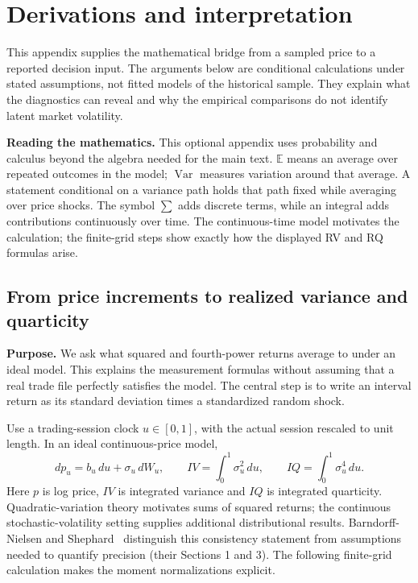 \section{Derivations and interpretation}\label{app:identities}
This appendix supplies the mathematical bridge from a sampled price to a reported decision input. The arguments below are conditional calculations under stated assumptions, not fitted models of the historical sample. They explain what the diagnostics can reveal and why the empirical comparisons do not identify latent market volatility.

\textbf{Reading the mathematics.} This optional appendix uses probability and calculus beyond the algebra needed for the main text. $\mathbb E$ means an average over repeated outcomes in the model; $\operatorname{Var}$ measures variation around that average. A statement conditional on a variance path holds that path fixed while averaging over price shocks. The symbol $\sum$ adds discrete terms, while an integral adds contributions continuously over time. The continuous-time model motivates the calculation; the finite-grid steps show exactly how the displayed RV and RQ formulas arise.

\subsection{From price increments to realized variance and quarticity}\label{app:moments}
\textbf{Purpose.} We ask what squared and fourth-power returns average to under an ideal model. This explains the measurement formulas without assuming that a real trade file perfectly satisfies the model. The central step is to write an interval return as its standard deviation times a standardized random shock.

Use a trading-session clock $u\in[0,1]$, with the actual session rescaled to unit length. In an ideal continuous-price model,
\begin{equation}
 dp_u=b_u\,du+\sigma_u\,dW_u,\qquad
 IV=\int_0^1\sigma_u^2\,du,\qquad IQ=\int_0^1\sigma_u^4\,du.
\end{equation}
Here $p$ is log price, $IV$ is integrated variance and $IQ$ is integrated quarticity. Quadratic-variation theory motivates sums of squared returns; the continuous stochastic-volatility setting supplies additional distributional results. Barndorff-Nielsen and Shephard~\cite{bns} distinguish this consistency statement from assumptions needed to quantify precision (their Sections 1 and 3). The following finite-grid calculation makes the moment normalizations explicit.

